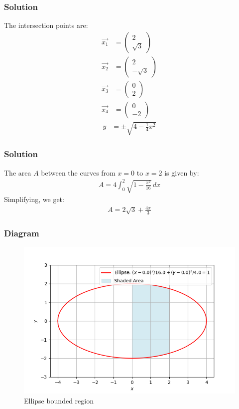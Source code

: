 \documentclass{beamer}
\begin{document}
\begin{frame}
\frametitle{Solution}
The intersection points are:
\begin{align}
\vec{x_1} &= \begin{pmatrix}2\\\sqrt{3}\end{pmatrix}\\
\vec{x_2} &= \begin{pmatrix}2\\-\sqrt{3}\end{pmatrix}\\
\vec{x_3} &= \begin{pmatrix}0\\2\end{pmatrix}\\
\vec{x_4} &= \begin{pmatrix}0\\-2\end{pmatrix}
\end{align}
\begin{align}
y &= \pm \sqrt{4 - \frac{1}{4}x^2}
\end{align}
\end{frame}

\begin{frame}
\frametitle{Solution}
The area \( A \) between the curves from \( x = 0 \) to \( x = 2 \) is given by:
\begin{align}
A = 4 \int_0^2 \sqrt{1 - \frac{x^2}{16}} \, dx
\end{align}
Simplifying, we get:
\begin{align}
A = 2\sqrt{3} + \frac{4\pi}{3}
\end{align}
\end{frame}

\begin{frame}
\frametitle{Diagram}
\begin{figure}[!ht]
    \centering
    \includegraphics[width=\linewidth]{figs/fig1.png}
    \caption{Ellipse bounded region}
\end{figure}
\end{frame}
\end{document}
